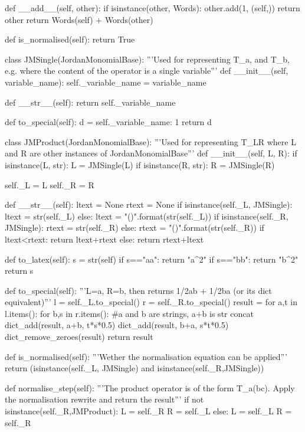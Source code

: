 \documentclass{article}
\begin{document}
\begin{python}
    def __add__(self, other):
        if isinstance(other, Words):
            other.add(1, (self,))
            return other
        return Words(self) + Words(other)

    def is_normalised(self):
        return True

class JMSingle(JordanMonomialBase):
    '''Used for representing T_a, and T_b, e.g. where
    the content of the operator is a single variable'''
    def __init__(self, variable_name):
        self._variable_name = variable_name

    def __str__(self):
        return self._variable_name

    def to_special(self):
        d = {self._variable_name: 1}
        return d

class JMProduct(JordanMonomialBase):
    '''Used for representing T_{LR} where L and R are
    other instances of JordanMonomialBase'''
    def __init__(self, L, R):
        if isinstance(L, str):
            L = JMSingle(L)
        if isinstance(R, str):
            R = JMSingle(R)

        self._L = L
        self._R = R

    def __str__(self):
        ltext = None
        rtext = None
        if isinstance(self._L, JMSingle):
            ltext = str(self._L)
        else:
            ltext = "({})".format(str(self._L))
        if isinstance(self._R, JMSingle):
            rtext = str(self._R)
        else:
            rtext = "({})".format(str(self._R))
        if ltext<rtext:
            return ltext+rtext
        else:
            return rtext+ltext

    def to_latex(self):
        s = str(self)
        if s=="aa": return "a^2"
        if s=="bb": return "b^2"
        return s

    def to_special(self):
        '''L=a, R=b, then returns 1/2ab + 1/2ba (or its dict equivalent)'''
        l = self._L.to_special()
        r = self._R.to_special()
        result = {}
        for a,t in l.items():
            for b,s in r.items(): #a and b are strings, a+b is str concat
                dict_add(result, a+b, t*s*0.5)
                dict_add(result, b+a, s*t*0.5)
        dict_remove_zeroes(result)
        return result

    def is_normalised(self):
        '''Wether the normalisation equation can be applied'''
        return (isinstance(self._L, JMSingle) and isinstance(self._R,JMSingle))

    def normalise_step(self):
        '''The product operator is of the form T_{a(bc)}. Apply the normalisation rewrite and return the result'''
        if not isinstance(self._R,JMProduct):
            L = self._R
            R = self._L
        else:
            L = self._L
            R = self._R
        

\end{python}
\end{document}
